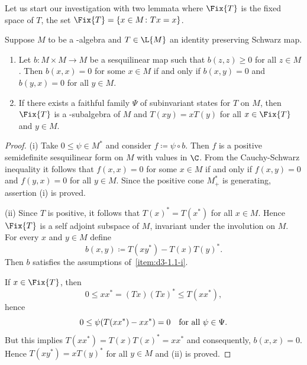 Let us start our investigation with two lemmata where $ \Fix{T} $ is the fixed space of\/ $T$, \ie the set $ \Fix{T} = \{x\in M \colon Tx=x \}$.
\begin{lemma}\label{lem:d3-1.1}
Suppose $M$ to be a \CA-algebra and $ T \in \L{M} $ an identity preserving Schwarz map.
\begin{enumerate}[\upshape (i)]%

\item\label{item:d3-1.1-i}
Let $ b \colon M \times M \to M $ be a sesquilinear map such that $ b(z,z) \geq 0 $ for all $ z \in M $.
Then $ b(x,x) = 0 $ for some $x\in M$ if and only if\/ $b(x,y) = 0$ and $b(y,x) = 0$ for all $y\in M$.

\item\label{item:d3-1.1-ii}
If there exists a faithful family $\Psi$ of subinvariant states for $T$ on $M$, then $\Fix{T}$ is a \CA-subalgebra of\/ $M$ and $T(xy) = xT(y)$ for all $ x \in \Fix{T} $ and $ y \in M $.

\end{enumerate}
\end{lemma}
\begin{proof} 
(i) Take $0 \leq \psi \in M^{*}$ and consider $f \coloneqq \psi\circ b$.
Then $f$ is a positive semidefinite sesquilinear form on $M$ with values in $\C$.
From the Cauchy-Schwarz inequality it follows that $f(x,x) = 0$ for some $x\in M$ if and only if\/ $f(x,y) = 0$ and $f(y,x) = 0$ for all $y\in M$.
Since the positive cone $M^{*}_{+}$ is generating, assertion (i) is proved.

(ii) Since $T$ is positive,  it follows that $T(x)^{*} = T(x^{*})$ for all $x \in M$.
Hence $\Fix{T}$ is a self adjoint subspace of\/ $M$, \ie invariant under the involution on $M$.
For every $x$ and $ y \in M $ define
\[
	b(x,y) \coloneqq T(xy^{*}) - T(x)T(y)^{*}.
\]
Then $b$ satisfies the assumptions of~\ref{item:d3-1.1-i}.

If\/ $x\in\Fix{T}$, then
\[
0 \leq xx^{*} = (Tx)(Tx)^{*} \leq T(xx^{*}),
\]
hence
\[
0 \leq \psi(T(xx^{*}) - xx^{*}) = 0 \quad \text{for all $ \psi\in\Psi $.} 
\]
But this implies $T(xx^{*}) = T(x)T(x)^{*} = xx^{*}$ and consequently, $b(x,x) = 0$.
Hence $T(xy^{*}) = xT(y)^{*}$ for all $y\in M$ and (ii) is proved.
\end{proof}
